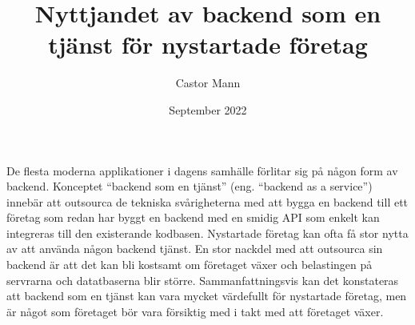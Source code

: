 \documentclass{article}
\title{Nyttjandet av backend som en tjänst för nystartade företag}
\author{Castor Mann }
\date{September 2022}
\begin{document}
\maketitle
De flesta moderna applikationer i dagens samhälle förlitar sig på någon form av backend.
\newline\newline
Konceptet “backend som en tjänst” (eng. “backend as a service”) innebär att outsourca de tekniska svårigheterna med att bygga en backend till ett företag som redan har byggt en backend med en smidig API som enkelt kan integreras till den existerande kodbasen.
\newline\newline
Nystartade företag kan ofta få stor nytta av att använda någon backend tjänst.
\newline\newline
En stor nackdel med att outsourca sin backend är att det kan bli kostsamt om företaget växer och belastingen på servrarna och datatbaserna blir större.
\newline\newline
Sammanfattningsvis kan det konstateras att backend som en tjänst kan vara mycket värdefullt för nystartade företag, men är något som företaget bör vara försiktig med i takt med att företaget växer.
\end{document}
